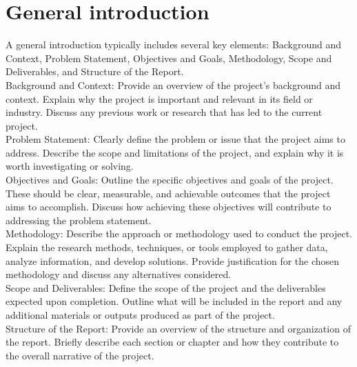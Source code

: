 \chapter*{General introduction}

A general introduction typically includes several key elements: Background and Context, Problem Statement, Objectives and Goals, Methodology, Scope and Deliverables, and Structure of the Report.\\

Background and Context: Provide an overview of the project's background and context. Explain why the project is important and relevant in its field or industry. Discuss any previous work or research that has led to the current project.\\

Problem Statement: Clearly define the problem or issue that the project aims to address. Describe the scope and limitations of the project, and explain why it is worth investigating or solving.\\

Objectives and Goals: Outline the specific objectives and goals of the project. These should be clear, measurable, and achievable outcomes that the project aims to accomplish. Discuss how achieving these objectives will contribute to addressing the problem statement.\\

Methodology: Describe the approach or methodology used to conduct the project. Explain the research methods, techniques, or tools employed to gather data, analyze information, and develop solutions. Provide justification for the chosen methodology and discuss any alternatives considered.\\

Scope and Deliverables: Define the scope of the project and the deliverables expected upon completion. Outline what will be included in the report and any additional materials or outputs produced as part of the project.\\

Structure of the Report: Provide an overview of the structure and organization of the report. Briefly describe each section or chapter and how they contribute to the overall narrative of the project.

